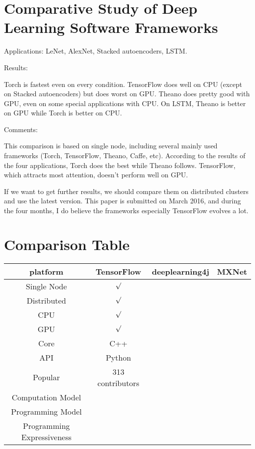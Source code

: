 \documentclass{article}
\begin{document}
\section{Comparative Study of Deep Learning Software Frameworks}
Applications: LeNet, AlexNet, Stacked autoencoders, LSTM.

Results:

Torch is fastest even on every condition. TensorFlow does well on CPU (except on Stacked autoencoders) but does worst on GPU. Theano does pretty good with GPU, even on some special applications with CPU. On LSTM, Theano is better on GPU while Torch is better on CPU.

Comments:

This comparison is based on single node, including several mainly used frameworks (Torch, TensorFlow, Theano, Caffe, etc). According to the results of the four applications, Torch does the best while Theano follows. TensorFlow, which attracts most attention, doesn't perform well on GPU.

If we want to get further results, we should compare them on distributed clusters and use the latest version. This paper is submitted on March 2016, and during the four months, I do believe the frameworks especially TensorFlow evolves a lot.
\section{Comparison Table}
\begin{tabular}{|c|c|c|c|}
\hline
platform & TensorFlow & deeplearning4j & MXNet \\
\hline
Single Node & ${\surd}$  &  &  \\
\hline
Distributed & ${\surd}$ &  &   \\
\hline
CPU & ${\surd}$ &  &  \\
\hline
GPU & ${\surd}$ &  &  \\
\hline
Core & C++ &  &  \\
\hline
API & Python &  &  \\
\hline
Popular & 313 contributors &  &  \\
\hline
Computation Model & &  \\
\hline
Programming Model & & \\
\hline
Programming Expressiveness & & \\
\hline
\end{tabular}
\end{document}
